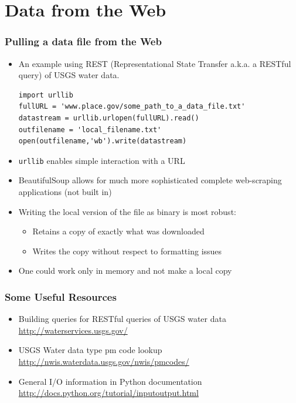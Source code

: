 \documentclass{beamer}
\begin{document}
\section{Data from the Web}
\begin{frame}[fragile]
\frametitle{Pulling a data file from the Web}
\begin{itemize}

\item An example using REST (Representational State Transfer a.k.a. a RESTful query) of USGS water data.
\begin{lstlisting}
import urllib
fullURL = 'www.place.gov/some_path_to_a_data_file.txt'
datastream = urllib.urlopen(fullURL).read()
outfilename = 'local_filename.txt'
open(outfilename,'wb').write(datastream)
\end{lstlisting}

\item \texttt{urllib} enables simple interaction with a URL
\item BeautifulSoup allows for much more sophisticated complete web-scraping applications (not built in)
\item Writing the local version of the file as binary is most robust:
\begin{itemize}
\item Retains a copy of exactly what was downloaded
\item Writes the copy without respect to formatting issues
\end{itemize}
\item One could work only in memory and not make a local copy
\end{itemize}
\end{frame}

\begin{frame}[fragile]
\frametitle{Some Useful Resources}
\begin{itemize}

\item Building queries for RESTful queries of USGS water data \\  \url{http://waterservices.usgs.gov/}
\item USGS Water data type pm code lookup \\
\url{http://nwis.waterdata.usgs.gov/nwis/pmcodes/}
\item General I/O information in Python documentation \\ 
\url{http://docs.python.org/tutorial/inputoutput.html}
\end{itemize}
\end{frame}
\end{document}
